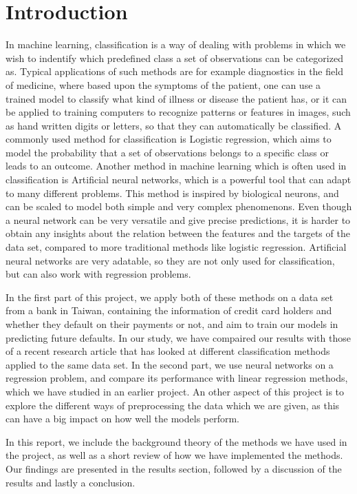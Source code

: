 \section{Introduction}\label{sec:Introduction}
In machine learning, classification is a way of dealing with problems in which we wish to indentify which predefined class a set of observations can be categorized as. Typical applications of such methods are for example diagnostics in the field of medicine, where based upon the symptoms of the patient, one can use a trained model to classify what kind of illness or disease the patient has, or it can be applied to training computers to recognize patterns or features in images, such as hand written digits or letters, so that they can automatically be classified. A commonly used method for classification is Logistic regression, which aims to model the probability that a set of observations belongs to a specific class or leads to an outcome. Another method in machine learning which is often used in classification is Artificial neural networks, which is a powerful tool that can adapt to many different problems. This method is inspired by biological neurons, and can be scaled to model both simple and very complex phenomenons. Even though a neural network can be very versatile and give precise predictions, it is harder to obtain any insights about the relation between the features and the targets of the data set, compared to more traditional methods like logistic regression. Artificial neural networks are very adatable, so they are not only used for classification, but can also work with regression problems.

In the first part of this project, we apply both of these methods on a data set from a bank in Taiwan, containing the information of credit card holders and whether they default on their payments or not, and aim to train our models in predicting future defaults. In our study, we have compaired our results with those of a recent research article\cite{YehLien} that has looked at different classification methods applied to the same data set. In the second part, we use neural networks on a regression problem, and compare its performance with linear regression methods, which we have studied in an earlier project\cite{project1}. An other aspect of this project is to explore the different ways of preprocessing the data which we are given, as this can have a big impact on how well the models perform. 

In this report, we include the background theory of the methods we have used in the project, as well as a short review of how we have implemented the methods. Our findings are presented in the results section, followed by a discussion of the results and lastly a conclusion.

